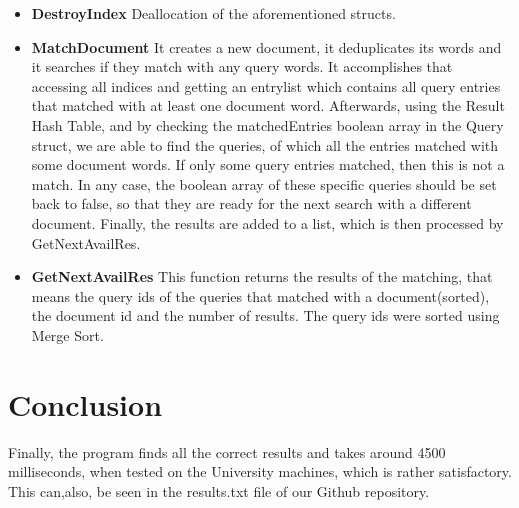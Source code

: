 \documentclass{article}
\begin{document}
\begin{itemize}
\begin{itemize}
  \item \textbf{DestroyIndex}
  Deallocation of the aforementioned structs.
  \item \textbf{MatchDocument}
  It creates a new document, it deduplicates its words and it searches if they match with any query words. It accomplishes that accessing all indices and getting an entrylist which contains all query entries that matched with at least one document word. Afterwards, using the Result Hash Table, and by checking the matchedEntries boolean array in the Query struct, we are able to find the queries, of which all the entries matched with some document words. If only some query entries matched, then this is not a match. In any case, the boolean array of these specific queries should be set back to false, so that they are ready for the next search with a different document. Finally, the results are added to a list, which is then processed by GetNextAvailRes.
  \item \textbf{GetNextAvailRes}
  This function returns the results of the matching, that means the query ids of the queries that matched with a document(sorted), the document id and the number of results. The query ids were sorted using Merge Sort.
  \end{itemize}
\end{itemize}
\section{Conclusion}
Finally, the program finds all the correct results and takes around 4500 milliseconds, when tested on the University machines, which is rather satisfactory. This can,also, be seen in the results.txt file of our Github repository.
\end{document}
